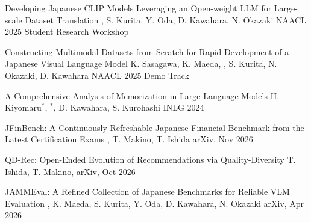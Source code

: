\documentclass[10pt, a4paper]{article}
\begin{document}
\cvpub
  {Developing Japanese CLIP Models Leveraging an Open-weight LLM for Large-scale Dataset Translation}
  {, S. Kurita, Y. Oda, D. Kawahara, N. Okazaki}
  {NAACL 2025 Student Research Workshop}
  {
   }

\cvpub
  {Constructing Multimodal Datasets from Scratch for Rapid Development of a Japanese Visual Language Model}
  {K. Sasagawa, K. Maeda, , S. Kurita, N. Okazaki, D. Kawahara}
  {NAACL 2025 Demo Track}
  {
   }

\cvpub
  {A Comprehensive Analysis of Memorization in Large Language Models}
  {H. Kiyomaru$^*$, $^*$, D. Kawahara, S. Kurohashi }
  {INLG 2024}
  {
   }


\cvpub
  {JFinBench: A Continuously Refreshable Japanese Financial Benchmark from the Latest Certification Exams}
  {, T. Makino, T. Ishida}
  {arXiv, Nov 2026}
  {
   }

\cvpub
  {QD-Rec: Open-Ended Evolution of Recommendations via Quality-Diversity}
  {T. Ishida, T. Makino, }
  {arXiv, Oct 2026}
  {
   }

\cvpub
  {JAMMEval: A Refined Collection of Japanese Benchmarks for Reliable VLM Evaluation}
  {, K. Maeda, S. Kurita, Y. Oda, D. Kawahara, N. Okazaki}
  {arXiv, Apr 2026}
  {
   }
\end{document}
